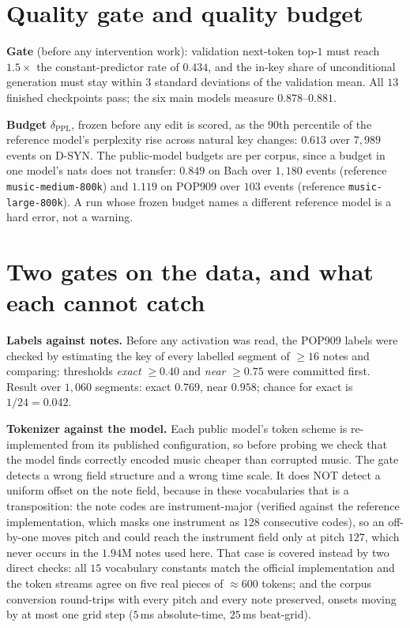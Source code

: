 \documentclass{article}
\begin{document}
\section{Quality gate and quality budget}

\textbf{Gate} (before any intervention work): validation next-token top-$1$ must reach
$1.5\times$ the constant-predictor rate of $0.434$, and the in-key share of
unconditional generation must stay within $3$ standard deviations of the validation
mean. All $13$ finished checkpoints pass; the six main models measure
$0.878$--$0.881$.

\textbf{Budget} $\delta_{\text{PPL}}$, frozen before any edit is scored, as the
$90$th percentile of the reference model's perplexity rise across natural key changes:
$0.613$ over $7{,}989$ events on D-SYN. The public-model budgets are per corpus, since
a budget in one model's nats does not transfer: $0.849$ on Bach over $1{,}180$ events
(reference \texttt{music-medium-800k}) and $1.119$ on POP909 over $103$ events
(reference \texttt{music-large-800k}). A run whose frozen budget names a different
reference model is a hard error, not a warning.

\section{Two gates on the data, and what each cannot catch}

\textbf{Labels against notes.} Before any activation was read, the POP909 labels were
checked by estimating the key of every labelled segment of $\geq16$ notes and
comparing: thresholds \emph{exact} $\geq0.40$ and \emph{near} $\geq0.75$ were committed
first. Result over $1{,}060$ segments: exact $0.769$, near $0.958$; chance for exact is
$1/24=0.042$.

\textbf{Tokenizer against the model.} Each public model's token scheme is
re-implemented from its published configuration, so before probing we check that the
model finds correctly encoded music cheaper than corrupted music. The gate detects a
wrong field structure and a wrong time scale. It does NOT detect a uniform offset on
the note field, because in these vocabularies that is a transposition: the note codes
are instrument-major (verified against the reference implementation, which masks one
instrument as $128$ consecutive codes), so an off-by-one moves pitch and could reach
the instrument field only at pitch $127$, which never occurs in the $1.94$M notes used
here. That case is covered instead by two direct checks: all $15$ vocabulary constants
match the official implementation and the token streams agree on five real pieces of
$\approx600$ tokens; and the corpus conversion round-trips with every pitch and every
note preserved, onsets moving by at most one grid step ($5$\,ms absolute-time,
$25$\,ms beat-grid).
\end{document}
